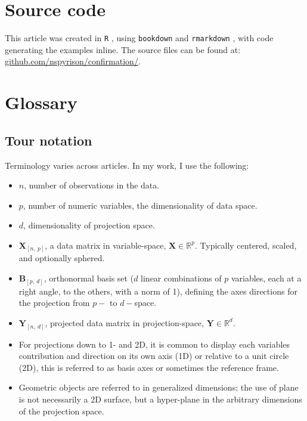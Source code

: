 \documentclass{monashthesis}
\begin{document}
\chapter*{Source code}\label{source-code}

This article was created in \texttt{R} \autocite{r_core_team_r:_2018},
using \texttt{bookdown} \autocite{xie_bookdown:_2016} and
\texttt{rmarkdown} \autocite{xie_r_2018}, with code generating the
examples inline. The source files can be found at:
\href{https://github.com/nspyrison/Confirmation}{github.com/nspyrison/confirmation/}.

\appendix

\chapter{Glossary}\label{ch:glossary}

\section{Tour notation}\label{sec:tour_notation}

Terminology varies across articles. In my work, I use the following:

\begin{itemize}
\tightlist
\item
  \(n\), number of observations in the data.
\item
  \(p\), number of numeric variables, the dimensionality of data space.
\item
  \(d\), dimensionality of projection space.
\item
  \(\textbf{X}_{[n,~p]}\), a data matrix in variable-space,
  \(\textbf{X} \in \mathbb{R}^{p}\). Typically centered, scaled, and
  optionally sphered.
\item
  \(\textbf{B}_{[p,~d]}\), orthonormal basis set (\(d\) linear
  combinations of \(p\) variables, each at a right angle, to the others,
  with a norm of 1), defining the axes directions for the projection
  from \(p-\) to \(d-\)space.
\item
  \(\textbf{Y}_{[n,~d]}\), projected data matrix in projection-space,
  \(\textbf{Y} \in \mathbb{R}^{d}\).
\item
  For projections down to 1- and 2D, it is common to display each
  variables contribution and direction on its own axis (1D) or relative
  to a unit circle (2D), this is referred to as basis axes or sometimes
  the reference frame.
\item
  Geometric objects are referred to in generalized dimensions; the use
  of plane is not necessarily a 2D surface, but a hyper-plane in the
  arbitrary dimensions of the projection space.
\end{itemize}
\end{document}
